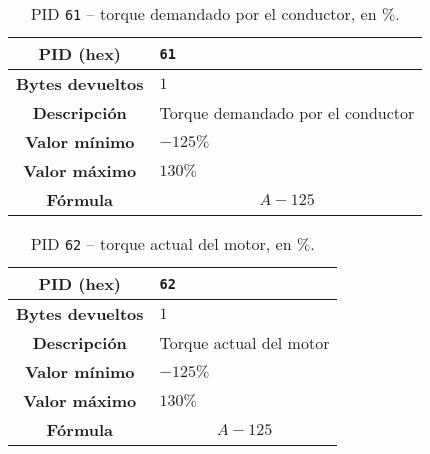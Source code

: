 \begin{table}[H]
  \centering
  \begin{tabularx}{\textwidth}{|c|X|}
    \hline
    \textbf{PID (hex)}       & \texttt{61}                       \\
    \hline
    \textbf{Bytes devueltos} & $1$                               \\
    \hline
    \textbf{Descripción}     & Torque demandado por el conductor \\
    \hline
    \textbf{Valor mínimo}    & $-125\%$                          \\
    \hline
    \textbf{Valor máximo}    & $130\%$                           \\
    \hline
    \textbf{Fórmula}         &                                   %
    \begin{equation*}
      A - 125
    \end{equation*}                                   \\
    \hline
  \end{tabularx}
  \caption{\ac{PID} \texttt{61} -- torque demandado por el conductor, en $\%$.}
\end{table}

\begin{table}[H]
  \centering
  \begin{tabularx}{\textwidth}{|c|X|}
    \hline
    \textbf{PID (hex)}       & \texttt{62}             \\
    \hline
    \textbf{Bytes devueltos} & $1$                     \\
    \hline
    \textbf{Descripción}     & Torque actual del motor \\
    \hline
    \textbf{Valor mínimo}    & $-125\%$                \\
    \hline
    \textbf{Valor máximo}    & $130\%$                 \\
    \hline
    \textbf{Fórmula}         &                         %
    \begin{equation*}
      A - 125
    \end{equation*}                         \\
    \hline
  \end{tabularx}
  \caption{\ac{PID} \texttt{62} -- torque actual del motor, en $\%$.}
\end{table}


